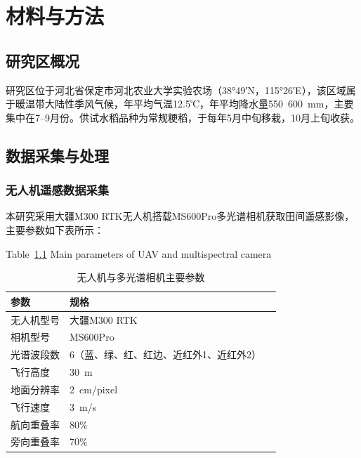 
\chapter{材料与方法}
\label{chap:method}

\section{研究区概况}
\label{sec:study_area}

研究区位于河北省保定市河北农业大学实验农场（38°49′N，115°26′E），该区域属于暖温带大陆性季风气候，年平均气温12.5℃，年平均降水量550~600~mm，主要集中在7--9月份。供试水稻品种为常规粳稻，于每年5月中旬移栽，10月上旬收获。

\section{数据采集与处理}
\label{sec:data}

\subsection{无人机遥感数据采集}
\label{subsec:uav}

本研究采用大疆M300 RTK无人机搭载MS600Pro多光谱相机获取田间遥感影像，主要参数如下表所示：

\begin{table}[htbp]
  \centering
  \caption{无人机与多光谱相机主要参数}
  \label{tab:uav_params}
  \bigskip
  {\normalfont Table~\ref{tab:uav_params} Main parameters of UAV and multispectral camera}\\[4pt]
  \begin{tabular}{lll}
    \toprule
    参数 & 规格 \\
    \midrule
    无人机型号 & 大疆M300 RTK \\
    相机型号 & MS600Pro \\
    光谱波段数 & 6（蓝、绿、红、红边、近红外1、近红外2） \\
    飞行高度 & 30~m \\
    地面分辨率 & 2~cm/pixel \\
    飞行速度 & 3~m/s \\
    航向重叠率 & 80\% \\
    旁向重叠率 & 70\% \\
    \bottomrule
  \end{tabular}
\end{table}

